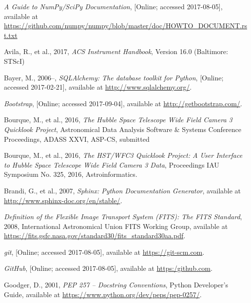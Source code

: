 \documentclass[10pt,journal,compsoc]{IEEEtran}
\begin{document}
\ifCLASSOPTIONcaptionsoff
  \newpage
\fi


\begin{thebibliography}{1}

\emph{A Guide to NumPy/SciPy Documentation}, [Online; accessed 2017-08-05], available at
\url{https://github.com/numpy/numpy/blob/master/doc/HOWTO_DOCUMENT.rst.txt}

Avila, R., et al., 2017, \emph{ACS Instrument Handbook}, Version 16.0 (Baltimore: STScI)

Bayer, M., 2006–, \emph{SQLAlchemy: The database toolkit for Python}, [Online; accessed 2017-02-21],
available at \url{http://www.sqlalchemy.org/}.

\emph{Bootstrap}, [Online; accessed 2017-09-04], available at \url{http://getbootstrap.com/}.

Bourque, M., et al., 2016, \emph{The Hubble Space Telescope Wide Field Camera 3 Quicklook Project},
Astronomical Data Analysis Software $\&$ Systems Conference Proceedings, ADASS XXVI, ASP-CS, submitted

Bourque, M., et al., 2016, \emph{The HST/WFC3 Quicklook Project: A User Interface to Hubble
Space Telescope Wide Field Camera 3 Data}, Proceedings IAU Symposium No. 325, 2016, Astroinformatics.

Brandi, G., et al., 2007, \emph{Sphinx: Python Documentation Generator}, available at
\url{http://www.sphinx-doc.org/en/stable/}.

\emph{Definition of the Flexible Image Transport System (FITS): The FITS Standard}, 2008,
International Astronomical Union FITS Working Group, available at
\url{https://fits.gsfc.nasa.gov/standard30/fits_standard30aa.pdf}.

\emph{git}, [Online; accessed 2017-08-05], available at \url{https://git-scm.com}.

\emph{GitHub}, [Online; accessed 2017-08-05], available at \url{https:/github.com}.

Goodger, D., 2001, \emph{PEP 257 -- Docstring Conventions}, Python Developer's Guide,
available at \url{https://www.python.org/dev/peps/pep-0257/}.


\end{thebibliography}
\end{document}
